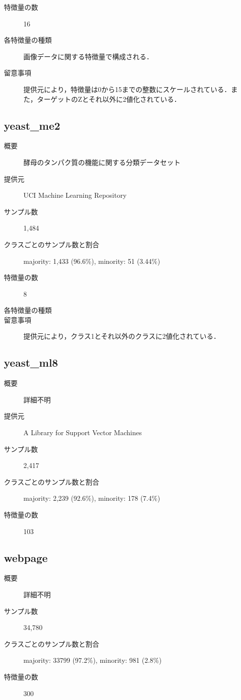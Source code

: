 \begin{description}
    \item[特徴量の数] 16
    \item[各特徴量の種類] 画像データに関する特徴量で構成される．
        
    \item[留意事項] 提供元により，特徴量は0から15までの整数にスケールされている．また，ターゲットのZとそれ以外に2値化されている．
\end{description}


\subsection{yeast\_me2}
\begin{description}
    \item[概要] 酵母のタンパク質の機能に関する分類データセット\cite{yeast}
    \item[提供元] UCI Machine Learning Repository
    \item[サンプル数] 1,484
    \item[クラスごとのサンプル数と割合] majority: 1,433 (96.6\%), minority: 51 (3.44\%)

    \item[特徴量の数] 8
    \item[各特徴量の種類] \mbox{}
        
    \item[留意事項] 提供元により，クラス1とそれ以外のクラスに2値化されている．
\end{description}

\subsection{yeast\_ml8}
\begin{description}
    \item[概要] 詳細不明
    \item[提供元] A Library for Support Vector Machines
    \item[サンプル数] 2,417
    \item[クラスごとのサンプル数と割合] majority: 2,239 (92.6\%), minority: 178 (7.4\%)

    \item[特徴量の数] 103
\end{description}


\subsection{webpage}
\begin{description}
    \item[概要] 詳細不明
    \item[サンプル数] 34,780
    \item[クラスごとのサンプル数と割合] majority: 33799 (97.2\%), minority: 981 (2.8\%)

    \item[特徴量の数] 300
\end{description}


